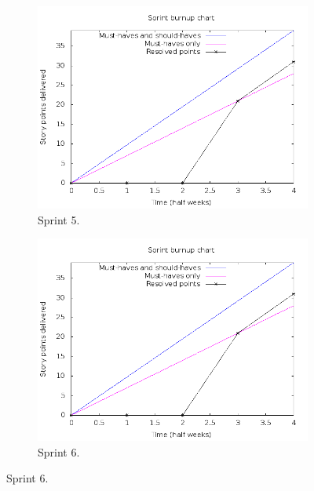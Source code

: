 \documentclass[a4paper,11pt]{article}
\begin{document}
\begin{figure}[!ht]
	\begin{subfigure}[b]{0.4\textwidth}
		\centering
		\centering
		\includegraphics[width=\textwidth]{img/burnup_sprint_5.png}
		\caption{Sprint 5.}
	\end{subfigure}
	\begin{subfigure}[b]{0.4\textwidth}
		\centering
		\centering
		\includegraphics[width=\textwidth]{img/burnup.png}
		\caption{Sprint 6.}
	\end{subfigure}
	\label{Collection of burnup graphs for this Pretested Integration project.}
\end{figure}
\end{document}
